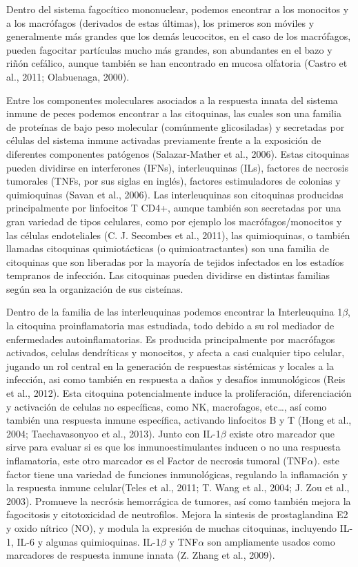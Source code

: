 \documentclass[12pt,a4paper,oneside]{scrbook}
\begin{document}
Dentro del sistema fagocítico mononuclear, podemos encontrar a los
monocitos y a los macrófagos (derivados de estas últimas), los primeros
son móviles y generalmente más grandes que los demás leucocitos, en el
caso de los macrófagos, pueden fagocitar partículas mucho más grandes,
son abundantes en el bazo y riñón cefálico, aunque también se han
encontrado en mucosa olfatoria (Castro et al., 2011; Olabuenaga, 2000).

Entre los componentes moleculares asociados a la respuesta innata del
sistema inmune de peces podemos encontrar a las citoquinas, las cuales
son una familia de proteínas de bajo peso molecular (comúnmente
glicosiladas) y secretadas por células del sistema inmune activadas
previamente frente a la exposición de diferentes componentes patógenos
(Salazar-Mather et al., 2006)⁠. Estas citoquinas pueden dividirse en
interferones (IFNs), interleuquinas (ILs), factores de necrosis
tumorales (TNFs, por sus siglas en inglés), factores estimuladores de
colonias y quimioquinas (Savan et al., 2006)⁠. Las interleuquinas son
citoquinas producidas principalmente por linfocitos T CD4+, aunque
también son secretadas por una gran variedad de tipos celulares, como
por ejemplo los macrófagos/monocitos y las células endoteliales (C. J.
Secombes et al., 2011), las quimioquinas, o también llamadas citoquinas
quimiotácticas (o quimioatractantes) son una familia de citoquinas que
son liberadas por la mayoría de tejidos infectados en los estadíos
tempranos de infección. Las citoquinas pueden dividirse en distintas
familias según sea la organización de sus cisteínas.

Dentro de la familia de las interleuquinas podemos encontrar la
Interleuquina 1$\beta$, la citoquina proinflamatoria mas estudiada, todo
debido a su rol mediador de enfermedades autoinflamatorias. Es producida
principalmente por macrófagos activados, celulas dendríticas y
monocitos, y afecta a casi cualquier tipo celular, jugando un rol
central en la generación de respuestas sistémicas y locales a la
infección, asi como también en respuesta a daños y desafíos
inmunológicos (Reis et al., 2012). Esta citoquina potencialmente induce
la proliferación, diferenciación y activación de celulas no específicas,
como NK, macrofagos, etc\ldots{}, así como también una respuesta inmune
específica, activando linfocitos B y T (Hong et al., 2004;
Taechavasonyoo et al., 2013). Junto con IL-1$\beta$ existe otro marcador
que sirve para evaluar si es que los inmunoestimulantes inducen o no una
respuesta inflamatoria, este otro marcador es el Factor de necrosis
tumoral (TNF$\alpha$). este factor tiene una variedad de funciones
inmunológicas, regulando la inflamación y la respuesta inmune
celular(Teles et al., 2011; T. Wang et al., 2004; J. Zou et al., 2003).
Promueve la necrósis hemorrágica de tumores, así como también mejora la
fagocitosis y citotoxicidad de neutrofilos. Mejora la sintesis de
prostaglandina E2 y oxido nítrico (NO), y modula la expresión de muchas
citoquinas, incluyendo IL-1, IL-6 y algunas quimioquinas. IL-1$\beta$ y
TNF$\alpha$ son ampliamente usados como marcadores de respuesta inmune
innata (Z. Zhang et al., 2009).
\end{document}

